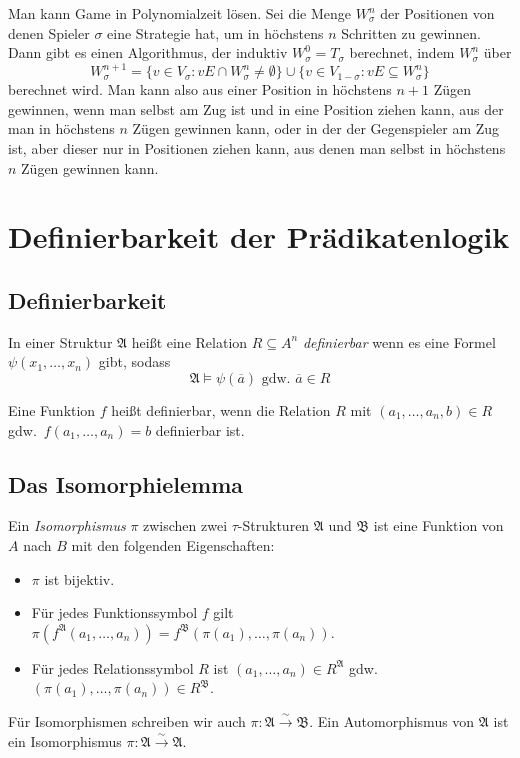 \documentclass[a4paper,parskip=half*,DIV=15,fontsize=11pt]{scrartcl}
\newcommand{\A}{\mathfrak{A}}
\newcommand{\B}{\mathfrak{B}}
\newcommand{\isoTo}{\overset{\sim}{\to}}
\begin{document}
Man kann Game in Polynomialzeit lösen. Sei die Menge $W_{\sigma}^n$ der Positionen von denen Spieler $\sigma$ eine Strategie hat, um in höchstens $n$ Schritten zu gewinnen. Dann gibt es einen Algorithmus, der induktiv $W_{\sigma}^0=T_{\sigma}$ berechnet, indem $W_{\sigma}^n$ über
\[W_{\sigma}^{n+1}=\{v \in V_{\sigma}:vE \cap W_{\sigma}^n \ne \emptyset \} \cup \{v \in V_{1-\sigma}:vE \subseteq W_{\sigma}^n\}\]
berechnet wird. Man kann also aus einer Position in höchstens $n + 1$ Zügen gewinnen, wenn man selbst am Zug ist und in eine Position ziehen kann, aus der man in höchstens $n$ Zügen gewinnen kann, oder in der der Gegenspieler am Zug ist, aber dieser nur in Positionen ziehen kann, aus denen man selbst in höchstens $n$ Zügen gewinnen kann.

\section{Definierbarkeit der Prädikatenlogik}
\subsection{Definierbarkeit}
In einer Struktur $\A$ heißt eine Relation $R \subseteq A^n$ \emph{definierbar} wenn es eine Formel $\psi(x_1, \ldots, x_n)$ gibt, sodass
\[\A \models \psi(\overline{a}) \text{ gdw.\ } \overline{a} \in R\]

Eine Funktion $f$ heißt definierbar, wenn die Relation $R$ mit $(a_1, \ldots, a_n, b) \in R$ gdw.\ $f(a_1,\ldots,a_n) = b$ definierbar ist.

\subsection{Das Isomorphielemma}

Ein \emph{Isomorphismus} $\pi$ zwischen zwei $\tau$-Strukturen $\A$ und $\B$ ist eine Funktion von $A$ nach $B$ mit den folgenden Eigenschaften:
\begin{itemize}
\item $\pi$ ist bijektiv.
\item Für jedes Funktionssymbol $f$ gilt $\pi(f^\A(a_1, \ldots, a_n)) = f^\B(\pi(a_1),\ldots,\pi(a_n))$.
\item Für jedes Relationssymbol $R$ ist $(a_1,\ldots,a_n) \in R^\A$ gdw.\ $(\pi(a_1),\ldots,\pi(a_n)) \in R^\B$.
\end{itemize}
Für Isomorphismen schreiben wir auch $\pi: \A \isoTo \B$. Ein Automorphismus von $\A$ ist ein Isomorphismus $\pi : \A \isoTo \A$.
\end{document}
